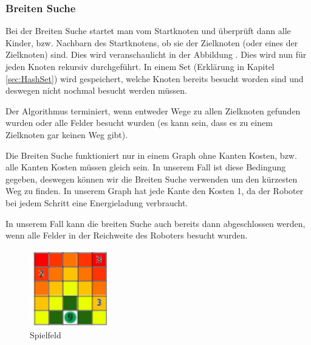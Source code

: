 \documentclass[a4paper,12pt,arial]{scrartcl}
\begin{document}
\subsubsection{Breiten Suche}


Bei der Breiten Suche startet man vom Startknoten und überprüft dann alle Kinder, bzw. Nachbarn des Startknotens, ob sie der Zielknoten (oder eines der Zielknoten) sind.
Dies wird veranschaulicht in der Abbildung .
Dies wird nun für jeden Knoten rekursiv durchgeführt.
In einem Set (Erklärung in Kapitel \ref{sec:HashSet}) wird gespeichert, welche Knoten bereits besucht worden sind und deswegen nicht nochmal besucht werden müssen.
\par
Der Algorithmus terminiert, wenn entweder Wege zu allen Zielknoten gefunden wurden oder alle Felder besucht wurden (es kann sein, dass es zu einem Zielknoten gar keinen Weg gibt).

Die Breiten Suche funktioniert nur in einem Graph ohne Kanten Kosten, bzw. alle Kanten Kosten müssen gleich sein. In unserem Fall ist diese Bedingung gegeben, deswegen können wir die Breiten Suche verwenden um den kürzesten Weg zu finden.
In unserem Graph hat jede Kante den Kosten 1, da der Roboter bei jedem Schritt eine Energieladung verbraucht.
\par
In unserem Fall kann die breiten Suche auch bereits dann abgeschlossen werden, wenn alle Felder in der Reichweite des Roboters besucht wurden.

\begin{figure}
    \includegraphics[width=0.3\textwidth]{Stromrallye_Feld_BFS.pdf}
    \caption{Spielfeld}
    \label{fig:bfs_stromrallye}
    \vspace{-20pt}
\end{figure}
\end{document}
